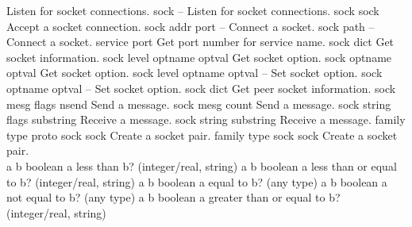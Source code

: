 \begin{longtable}{}
	{Listen for socket connections.}
\optableent
	{sock}
	{{\bf {}}}
	{--}
	{Listen for socket connections.}
\hline
\optableent
	{sock}
	{{\bf {}}}
	{sock}
	{Accept a socket connection.}
\hline
\optableent
	{sock addr port}
	{{\bf {}}}
	{--}
	{Connect a socket.}
\optableent
	{sock path}
	{{\bf {}}}
	{--}
	{Connect a socket.}
\hline
\optableent
	{service}
	{{\bf {}}}
	{port}
	{Get port number for service name.}
\hline
\optableent
	{sock}
	{{\bf {}}}
	{dict}
	{Get socket information.}
\hline
\optableent
	{sock level optname}
	{{\bf {}}}
	{optval}
	{Get socket option.}
\optableent
	{sock optname}
	{{\bf {}}}
	{optval}
	{Get socket option.}
\hline
\optableent
	{sock level optname optval}
	{{\bf {}}}
	{--}
	{Set socket option.}
\optableent
	{sock optname optval}
	{{\bf {}}}
	{--}
	{Set socket option.}
\hline
\optableent
	{sock}
	{{\bf {}}}
	{dict}
	{Get peer socket information.}
\hline
\optableent
	{sock mesg flags}
	{{\bf {}}}
	{nsend}
	{Send a message.}
\optableent
	{sock mesg}
	{{\bf {}}}
	{count}
	{Send a message.}
\hline
\optableent
	{sock string flags}
	{{\bf {}}}
	{substring}
	{Receive a message.}
\optableent
	{sock string}
	{{\bf {}}}
	{substring}
	{Receive a message.}
\hline
\optableent
	{family type proto}
	{{\bf {}}}
	{sock sock}
	{Create a socket pair.}
\optableent
	{family type}
	{{\bf {}}}
	{sock sock}
	{Create a socket pair.}
\hline \hline
{} \\
\hline \hline
\optableent
	{a b}
	{{\bf {}}}
	{boolean}
	{a less than b? (integer/real, string)}
\hline
\optableent
	{a b}
	{{\bf {}}}
	{boolean}
	{a less than or equal to b? (integer/real, string)}
\hline
\optableent
	{a b}
	{{\bf {}}}
	{boolean}
	{a equal to b? (any type)}
\hline
\optableent
	{a b}
	{{\bf {}}}
	{boolean}
	{a not equal to b? (any type)}
\hline
\optableent
	{a b}
	{{\bf {}}}
	{boolean}
	{a greater than or equal to b? (integer/real, string)}

\end{longtable}
